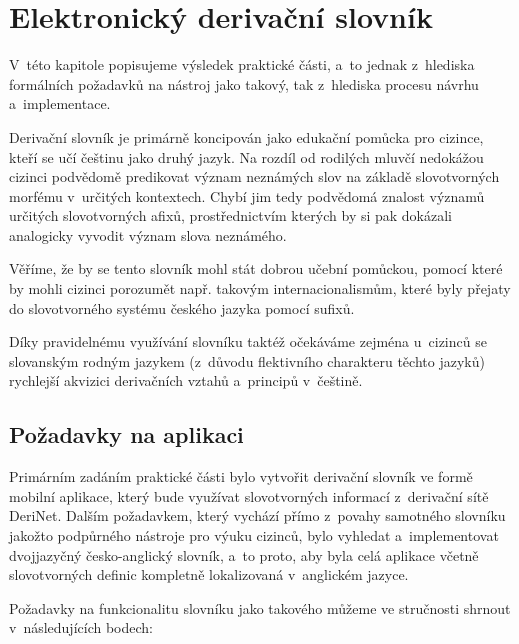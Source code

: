 \hypertarget{elektronickuxfd-derivaux10dnuxed-slovnuxedk}{%
\chapter{Elektronický derivační
slovník}\label{elektronickuxfd-derivaux10dnuxed-slovnuxedk}}

V~této kapitole popisujeme výsledek praktické části, a~to jednak
z~hlediska formálních požadavků na nástroj jako takový, tak z~hlediska
procesu návrhu a~implementace.

Derivační slovník je primárně koncipován jako edukační pomůcka pro
cizince, kteří se učí češtinu jako druhý jazyk. Na rozdíl od rodilých
mluvčí nedokážou cizinci podvědomě predikovat význam neznámých slov na
základě slovotvorných morfému v~určitých kontextech. Chybí jim tedy
podvědomá znalost významů určitých slovotvorných afixů, prostřednictvím
kterých by si pak dokázali analogicky vyvodit význam slova neznámého.

Věříme, že by se tento slovník mohl stát dobrou učební pomůckou, pomocí
které by mohli cizinci porozumět např. takovým internacionalismům, které
byly přejaty do slovotvorného systému českého jazyka pomocí sufixů.

Díky pravidelnému využívání slovníku taktéž očekáváme zejména u~cizinců
se slovanským rodným jazykem (z~důvodu flektivního charakteru těchto
jazyků) rychlejší akvizici derivačních vztahů a~principů v~češtině.

\hypertarget{poux17eadavky-na-aplikaci}{%
\section{Požadavky na aplikaci}\label{poux17eadavky-na-aplikaci}}

Primárním zadáním praktické části bylo vytvořit derivační slovník ve
formě mobilní aplikace, který bude využívat slovotvorných informací
z~derivační sítě DeriNet. Dalším požadavkem, který vychází přímo z~povahy
samotného slovníku jakožto podpůrného nástroje pro výuku cizinců, bylo
vyhledat a~implementovat dvojjazyčný česko-anglický slovník, a~to proto,
aby byla celá aplikace včetně slovotvorných definic kompletně
lokalizovaná v~anglickém jazyce.

Požadavky na funkcionalitu slovníku jako takového můžeme ve stručnosti
shrnout v~následujících bodech:

